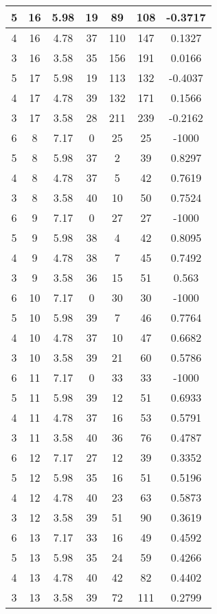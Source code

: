 \documentclass[letterpaper, 12pt]{article}
\begin{document}
\begin{longtable}{|c|c|c|c|c|c|c|}
\hline
5 & 16 & 5.98 & 19 & 89 & 108 & -0.3717 \\
\hline
4 & 16 & 4.78 & 37 & 110 & 147 & 0.1327 \\
\hline
3 & 16 & 3.58 & 35 & 156 & 191 & 0.0166 \\
\hline
5 & 17 & 5.98 & 19 & 113 & 132 & -0.4037 \\
\hline
4 & 17 & 4.78 & 39 & 132 & 171 & 0.1566 \\
\hline
3 & 17 & 3.58 & 28 & 211 & 239 & -0.2162 \\
\hline
6 & 8 & 7.17 & 0 & 25 & 25 & -1000 \\
\hline
5 & 8 & 5.98 & 37 & 2 & 39 & 0.8297 \\
\hline
4 & 8 & 4.78 & 37 & 5 & 42 & 0.7619 \\
\hline
3 & 8 & 3.58 & 40 & 10 & 50 & 0.7524 \\
\hline
6 & 9 & 7.17 & 0 & 27 & 27 & -1000 \\
\hline
5 & 9 & 5.98 & 38 & 4 & 42 & 0.8095 \\
\hline
4 & 9 & 4.78 & 38 & 7 & 45 & 0.7492 \\
\hline
3 & 9 & 3.58 & 36 & 15 & 51 & 0.563 \\
\hline
6 & 10 & 7.17 & 0 & 30 & 30 & -1000 \\
\hline
5 & 10 & 5.98 & 39 & 7 & 46 & 0.7764 \\
\hline
4 & 10 & 4.78 & 37 & 10 & 47 & 0.6682 \\
\hline
3 & 10 & 3.58 & 39 & 21 & 60 & 0.5786 \\
\hline
6 & 11 & 7.17 & 0 & 33 & 33 & -1000 \\
\hline
5 & 11 & 5.98 & 39 & 12 & 51 & 0.6933 \\
\hline
4 & 11 & 4.78 & 37 & 16 & 53 & 0.5791 \\
\hline
3 & 11 & 3.58 & 40 & 36 & 76 & 0.4787 \\
\hline
6 & 12 & 7.17 & 27 & 12 & 39 & 0.3352 \\
\hline
5 & 12 & 5.98 & 35 & 16 & 51 & 0.5196 \\
\hline
4 & 12 & 4.78 & 40 & 23 & 63 & 0.5873 \\
\hline
3 & 12 & 3.58 & 39 & 51 & 90 & 0.3619 \\
\hline
6 & 13 & 7.17 & 33 & 16 & 49 & 0.4592 \\
\hline
5 & 13 & 5.98 & 35 & 24 & 59 & 0.4266 \\
\hline
4 & 13 & 4.78 & 40 & 42 & 82 & 0.4402 \\
\hline
3 & 13 & 3.58 & 39 & 72 & 111 & 0.2799 \\

\end{longtable}
\end{document}
